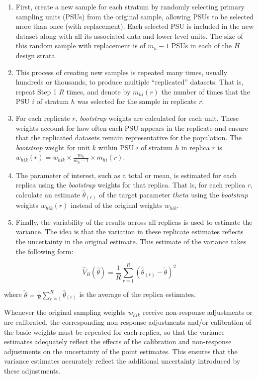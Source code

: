 \documentclass[
  12pt,
]{book}
\begin{document}
\begin{enumerate}
\def\labelenumi{\arabic{enumi}.}
\item
  First, create a new sample for each stratum by randomly selecting primary sampling units (PSUs) from the original sample, allowing PSUs to be selected more than once (with replacement). Each selected PSU is included in the new dataset along with all its associated data and lower level units. The size of this random sample with replacement is of \(m_h - 1\) PSUs in each of the \(H\) design strata.
\item
  This process of creating new samples is repeated many times, usually hundreds or thousands, to produce multiple ``replicated'' datasets. That is, repeat Step 1 \(R\) times, and denote by \(m_{hi}(r)\) the number of times that the PSU \(i\) of stratum \(h\) was selected for the sample in replicate \(r\).
\item
  For each replicate \(r\), \emph{bootstrap} weights are calculated for each unit. These weights account for how often each PSU appears in the replicate and ensure that the replicated datasets remain representative for the population. The \emph{bootstrap} weight for unit \(k\) within PSU \(i\) of stratum \(h\) in replica \(r\) is \(w_{hik}(r) = w_{hik} \times \frac {m_h}{m_h - 1} \times m_{hi}(r)\).
\item
  The parameter of interest, such as a total or mean, is estimated for each replica using the \emph{bootstrap} weights for that replica. That is, for each replica \(r\), calculate an estimate \(\widehat \theta_{(r)}\) of the target parameter \(theta\) using the \emph{bootstrap} weights \(w_{hik}(r)\) instead of the original weights \(w_{hik}\).
\item
  Finally, the variability of the results across all replicas is used to estimate the variance. The idea is that the variation in these replicate estimates reflects the uncertainty in the original estimate. This estimate of the variance takes the following form:
\end{enumerate}

\[
\widehat V_{B} \left( \widehat \theta \right) = \frac {1} {R} \sum_{r=1}^R \left( \widehat \theta_{(r)} - \tilde \theta \right)^2
\]

where \(\tilde \theta = \frac 1 R \sum_{r=1}^R \widehat \theta_{(r)}\) is the average of the replica estimates.

Whenever the original sampling weights \(w_{hik}\) receive non-response adjustments or are calibrated, the corresponding non-response adjustments and/or calibration of the basic weights must be repeated for each replica, so that the variance estimates adequately reflect the effects of the calibration and non-response adjustments on the uncertainty of the point estimates. This ensures that the variance estimates accurately reflect the additional uncertainty introduced by these adjustments.
\end{document}
